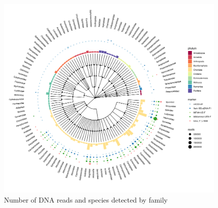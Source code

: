 \documentclass[10pt]{article}
\begin{document}
%

\begin{figure}[h!]
\centering
\includegraphics[width=\textwidth]{tree}
\caption{Number of DNA reads and species detected by family}
\end{figure}

\begin{multicols}{2}
\blindtext
\blindtext
\end{multicols}

\clearpage
\end{document}
